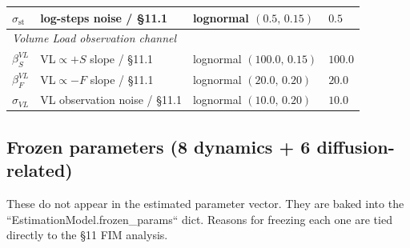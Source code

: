 \begin{center}
\begin{tabular}{llll}
$\sigma_\text{st}$ & log-steps noise / §11.1 & lognormal $(0.5,\,0.15)$ & $0.5$ \\
\midrule
\multicolumn{4}{l}{\textit{Volume Load observation channel}} \\
\midrule
$\beta_S^{VL}$ & VL$\propto +S$ slope / §11.1 & lognormal $(100.0,\,0.15)$ & $100.0$ \\
$\beta_F^{VL}$ & VL$\propto -F$ slope / §11.1 & lognormal $(20.0,\,0.20)$ & $20.0$ \\
$\sigma_{VL}$ & VL observation noise / §11.1 & lognormal $(10.0,\,0.20)$ & $10.0$ \\
\bottomrule
\end{tabular}
\end{center}

\subsection*{Frozen parameters (8 dynamics + 6 diffusion-related)}

These do not appear in the estimated parameter vector. They are baked
into the ``EstimationModel.frozen\_params`` dict. Reasons for freezing
each one are tied directly to the §11 FIM analysis.


